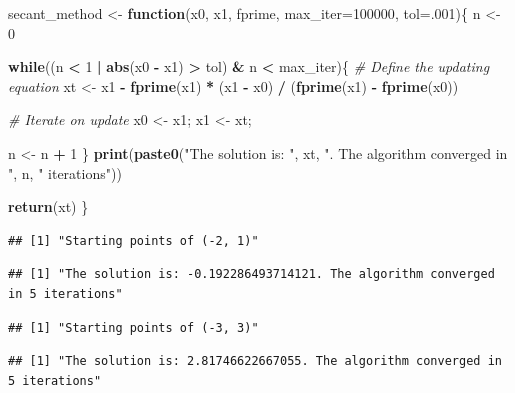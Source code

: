 \documentclass[]{article}
\newenvironment{Shaded}{\begin{snugshade}}{\end{snugshade}}
\newcommand{\KeywordTok}[1]{\textcolor[rgb]{0.13,0.29,0.53}{\textbf{#1}}}
\newcommand{\DataTypeTok}[1]{\textcolor[rgb]{0.13,0.29,0.53}{#1}}
\newcommand{\DecValTok}[1]{\textcolor[rgb]{0.00,0.00,0.81}{#1}}
\newcommand{\StringTok}[1]{\textcolor[rgb]{0.31,0.60,0.02}{#1}}
\newcommand{\CommentTok}[1]{\textcolor[rgb]{0.56,0.35,0.01}{\textit{#1}}}
\newcommand{\ControlFlowTok}[1]{\textcolor[rgb]{0.13,0.29,0.53}{\textbf{#1}}}
\newcommand{\OperatorTok}[1]{\textcolor[rgb]{0.81,0.36,0.00}{\textbf{#1}}}
\newcommand{\NormalTok}[1]{#1}
\begin{document}
\begin{Shaded}
\begin{Highlighting}[]
\NormalTok{secant_method <-}\StringTok{ }\ControlFlowTok{function}\NormalTok{(x0, x1, fprime, }\DataTypeTok{max_iter=}\DecValTok{100000}\NormalTok{, }\DataTypeTok{tol=}\NormalTok{.}\DecValTok{001}\NormalTok{)\{}
\NormalTok{  n <-}\StringTok{ }\DecValTok{0}
  
  \ControlFlowTok{while}\NormalTok{((n }\OperatorTok{<}\StringTok{ }\DecValTok{1} \OperatorTok{|}\StringTok{ }\KeywordTok{abs}\NormalTok{(x0 }\OperatorTok{-}\StringTok{ }\NormalTok{x1) }\OperatorTok{>}\StringTok{ }\NormalTok{tol) }\OperatorTok{&}\StringTok{ }\NormalTok{n }\OperatorTok{<}\StringTok{ }\NormalTok{max_iter)\{}
    \CommentTok{# Define the updating equation}
\NormalTok{    xt <-}\StringTok{ }\NormalTok{x1 }\OperatorTok{-}\StringTok{ }\KeywordTok{fprime}\NormalTok{(x1) }\OperatorTok{*}\StringTok{ }\NormalTok{(x1 }\OperatorTok{-}\StringTok{ }\NormalTok{x0) }\OperatorTok{/}\StringTok{ }\NormalTok{(}\KeywordTok{fprime}\NormalTok{(x1) }\OperatorTok{-}\StringTok{ }\KeywordTok{fprime}\NormalTok{(x0))}
    
    \CommentTok{# Iterate on update}
\NormalTok{    x0 <-}\StringTok{ }\NormalTok{x1; x1 <-}\StringTok{ }\NormalTok{xt;  }
    
\NormalTok{    n <-}\StringTok{ }\NormalTok{n }\OperatorTok{+}\StringTok{ }\DecValTok{1}
\NormalTok{  \}}
  \KeywordTok{print}\NormalTok{(}\KeywordTok{paste0}\NormalTok{(}\StringTok{"The solution is: "}\NormalTok{, xt, }\StringTok{". The algorithm converged in "}\NormalTok{, n, }\StringTok{" iterations"}\NormalTok{))}
  
  \KeywordTok{return}\NormalTok{(xt)}
\NormalTok{\}}
\end{Highlighting}
\end{Shaded}

\begin{verbatim}
## [1] "Starting points of (-2, 1)"
\end{verbatim}

\begin{verbatim}
## [1] "The solution is: -0.192286493714121. The algorithm converged in 5 iterations"
\end{verbatim}

\begin{verbatim}
## [1] "Starting points of (-3, 3)"
\end{verbatim}

\begin{verbatim}
## [1] "The solution is: 2.81746622667055. The algorithm converged in 5 iterations"
\end{verbatim}
\end{document}
